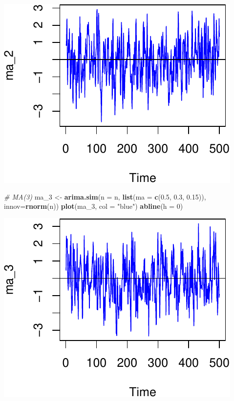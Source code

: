 \documentclass[11pt,]{article}
\newenvironment{Shaded}{\begin{snugshade}}{\end{snugshade}}
\newcommand{\KeywordTok}[1]{\textcolor[rgb]{0.13,0.29,0.53}{\textbf{#1}}}
\newcommand{\DataTypeTok}[1]{\textcolor[rgb]{0.13,0.29,0.53}{#1}}
\newcommand{\DecValTok}[1]{\textcolor[rgb]{0.00,0.00,0.81}{#1}}
\newcommand{\FloatTok}[1]{\textcolor[rgb]{0.00,0.00,0.81}{#1}}
\newcommand{\StringTok}[1]{\textcolor[rgb]{0.31,0.60,0.02}{#1}}
\newcommand{\CommentTok}[1]{\textcolor[rgb]{0.56,0.35,0.01}{\textit{#1}}}
\newcommand{\NormalTok}[1]{#1}
\begin{document}
\begin{center}\includegraphics{FMC_T4_PhD_ARMA_GARCH_files/figure-latex/MA-3} \end{center}

\begin{Shaded}
\begin{Highlighting}[]
\CommentTok{# MA(3)}
\NormalTok{ma_}\DecValTok{3}\NormalTok{ <-}\StringTok{ }\KeywordTok{arima.sim}\NormalTok{(}\DataTypeTok{n =}\NormalTok{ n, }\KeywordTok{list}\NormalTok{(}\DataTypeTok{ma =} \KeywordTok{c}\NormalTok{(}\FloatTok{0.5}\NormalTok{, }\FloatTok{0.3}\NormalTok{, }\FloatTok{0.15}\NormalTok{)), }\DataTypeTok{innov=}\KeywordTok{rnorm}\NormalTok{(n))}
\KeywordTok{plot}\NormalTok{(ma_}\DecValTok{3}\NormalTok{, }\DataTypeTok{col =} \StringTok{"blue"}\NormalTok{)}
\KeywordTok{abline}\NormalTok{(}\DataTypeTok{h =} \DecValTok{0}\NormalTok{)}
\end{Highlighting}
\end{Shaded}

\begin{center}\includegraphics{FMC_T4_PhD_ARMA_GARCH_files/figure-latex/MA-4} \end{center}
\end{document}
